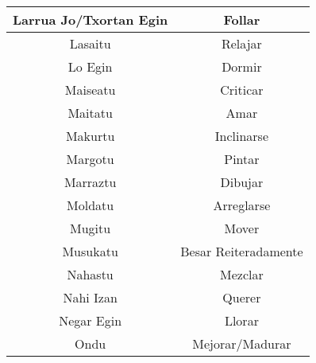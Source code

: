 \documentclass[11pt, a4paper]{article}
\begin{document}
\begin{table}[h]
\begin{tabular}{cc}
		                 Larrua Jo/Txortan Egin                  &                             Follar                             \\ \hline
		                        Lasaitu                          &                            Relajar                             \\ \hline
		                        Lo Egin                          &                             Dormir                             \\ \hline
		                        Maiseatu                         &                            Criticar                            \\ \hline
		                        Maitatu                          &                              Amar                              \\ \hline
		                        Makurtu                          &                           Inclinarse                           \\ \hline
		                        Margotu                          &                             Pintar                             \\ \hline
		                        Marraztu                         &                            Dibujar                             \\ \hline
		                        Moldatu                          &                           Arreglarse                           \\ \hline
		                         Mugitu                          &                             Mover                              \\ \hline
		                        Musukatu                         &                      Besar Reiteradamente                      \\ \hline
		                        Nahastu                          &                            Mezclar                             \\ \hline
		                       Nahi Izan                         &                             Querer                             \\ \hline
		                       Negar Egin                        &                             Llorar                             \\ \hline
		                          Ondu                           &                        Mejorar/Madurar                         \\ \hline

\end{tabular}
\end{table}
\end{document}
